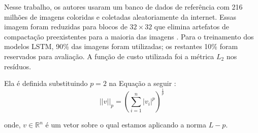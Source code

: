Nesse trabalho, os autores usaram um banco de dados de referência com 
216 milhões de imagens coloridas e coletadas aleatoriamente da internet. Essas imagem foram reduzidas para blocos de $32 \times 32$ que elimina artefatos de compactação preexistentes para a maioria das imagens \cite{Variable2016Toderici}. Para o treinamento dos modelos LSTM, 90\% das imagens foram utilizadas; os restantes 10\% foram reservados para avaliação.  A função de custo utilizada foi a métrica $L_2$ nos resíduos. 

Ela é definida substituindo $p=2$ na Equação a seguir \cite{nie2010efficient}:
\begin{equation}
||v||_p = \left ( \sum_{i=1}^n |v_i|^p \right)^{\frac{1}{p}}  
\end{equation}

onde, $v \in \mathbb{R}^n$ é um vetor sobre o qual estamos aplicando a norma $L-p$. 











